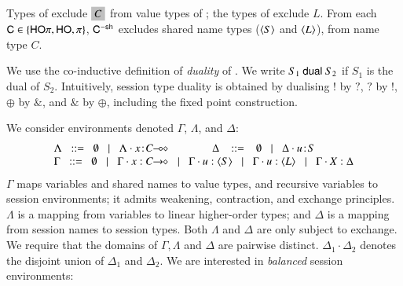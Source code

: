 \documentclass[runningheads]{llncs}
\begin{document}
Types of \HO exclude $\nonhosyntax{C}$ from 
value types of \HOp; the types of \sessp exclude $L$. 
From each $\mathsf{C} \in \{\mathsf{HO}\pi, \mathsf{HO}, \pi \}$, $\mathsf{C}^{-\mathsf{sh}}$ 
excludes shared name types ($\langle S \rangle$ and $\langle L \rangle$), 
from name type $C$.

We use the co-inductive definition of \emph{duality} of \cite{TGC14}.
We write $S_1 \ \mathsf{dual}\  S_2$ if $S_1$ is the dual of $S_2$.   
Intuitively, session type duality is  obtained by 
dualising $!$ by $?$, $?$ by $!$, $\oplus$ by $\&$, and $\&$ by $\oplus$,  
including the fixed point construction.


We consider environments denoted $\Gamma$, $\Lambda$, and $\Delta$:
\[
	\begin{array}{l}
		\Lambda \bnfis  \emptyset \bnfbar \Lambda \cat \AT{x}{\lhot{C}}
		\qquad\qquad \Delta  \ \bnfis  \ \emptyset \bnfbar \Delta \cat \AT{u}{S}
		\\
		\Gamma  \bnfis  \emptyset \bnfbar \Gamma \cat \varp{x}: \shot{C} \bnfbar \Gamma \cat u: \chtype{S} \bnfbar \Gamma \cat u: \chtype{L} 
		\bnfbar \Gamma \cat \rvar{X}: \Delta
	\end{array}
\]
$\Gamma$ maps variables and shared names to value types, and recursive 
variables to session environments;  
it admits weakening, contraction, and exchange principles.
$\Lambda$ is a mapping from variables to 
linear
higher-order
types; and $\Delta$ is a mapping from 
session names to session types. 
Both $\Lambda$ and $\Delta$
are
only subject to exchange.  
We require that the domains of $\Gamma,
\Lambda$ and $\Delta$ are pairwise distinct. 
$\Delta_1\cdot \Delta_2$ denotes the disjoint union of $\Delta_1$ and $\Delta_2$.  
We are interested in \emph{balanced} session environments: 
\end{document}
